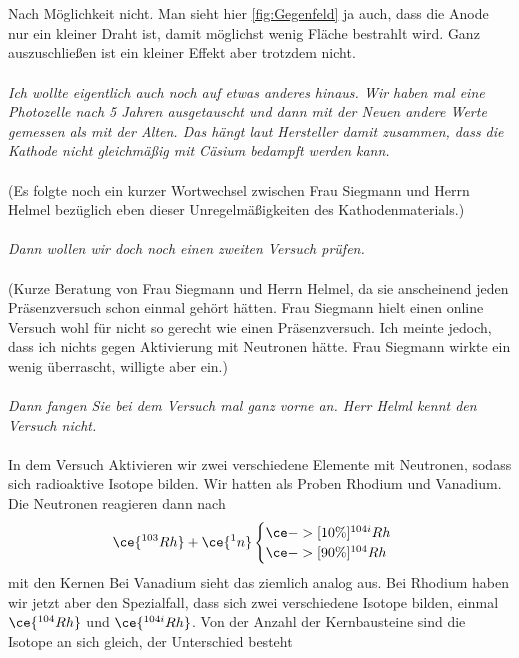\\\\\noindent
Nach Möglichkeit nicht. Man sieht hier \ref{fig:Gegenfeld} ja auch, dass die Anode nur ein kleiner Draht ist, damit möglichst wenig Fläche 
bestrahlt wird. Ganz auszuschließen ist ein kleiner Effekt aber trotzdem nicht. 
\\\\\noindent
\textit{Ich wollte eigentlich auch noch auf etwas anderes hinaus. Wir haben mal eine Photozelle nach 5 Jahren ausgetauscht und dann mit der 
Neuen andere Werte gemessen als mit der Alten. Das hängt laut Hersteller damit zusammen, dass die Kathode nicht gleichmäßig mit Cäsium 
bedampft werden kann.}
\\\\\noindent
(Es folgte noch ein kurzer Wortwechsel zwischen Frau Siegmann und Herrn Helmel bezüglich eben dieser Unregelmäßigkeiten des Kathodenmaterials.)
\\\\\noindent
\textit{Dann wollen wir doch noch einen zweiten Versuch prüfen.}
\\\\\noindent
(Kurze Beratung von Frau Siegmann und Herrn Helmel, da sie anscheinend jeden Präsenzversuch schon einmal gehört hätten. Frau Siegmann hielt 
einen online Versuch wohl für nicht so gerecht wie einen Präsenzversuch. Ich meinte jedoch, dass ich nichts gegen Aktivierung mit Neutronen
hätte. Frau Siegmann wirkte ein wenig überrascht, willigte aber ein.)
\\\\\noindent
\textit{Dann fangen Sie bei dem Versuch mal ganz vorne an. Herr Helml kennt den Versuch nicht.}
\\\\\noindent
In dem Versuch Aktivieren wir zwei verschiedene Elemente mit Neutronen, sodass sich radioaktive Isotope bilden. Wir hatten als Proben 
Rhodium und Vanadium. Die Neutronen reagieren dann nach 
\begin{equation}
        \ce{^{103}Rh}+\ce{^{1}n}
        \begin{cases}
            \ce{->[10\%]^{104 i}Rh}\\
            \ce{->[90\%]^{104}Rh}
        \end{cases}
\end{equation}
mit den Kernen
Bei Vanadium sieht das ziemlich analog aus. Bei Rhodium haben wir jetzt aber den Spezialfall, dass sich zwei verschiedene Isotope bilden, 
einmal $\ce{^{104}Rh}$ und $\ce{^{104i}Rh}$. Von der Anzahl der Kernbausteine sind die Isotope an sich gleich, der Unterschied besteht 
